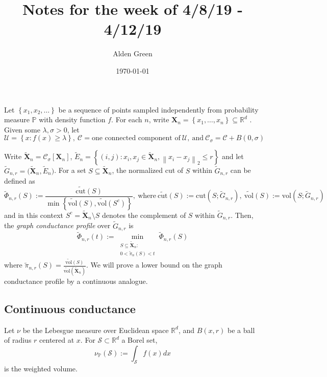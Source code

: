 \documentclass{article}
\newcommand{\Reals}{\mathbb{R}}
\newcommand{\norm}[1]{\left\lVert#1\right\rVert}
\newcommand{\set}[1]{\left\{#1\right\}}
\newcommand{\Rd}{\Reals^d}
\newcommand{\Xbf}{\mathbf{X}}
\newcommand{\Cset}{\mathcal{C}}
\newcommand{\Sset}{\mathcal{S}}
\newcommand{\Csig}{\Cset_{\sigma}}
\newcommand{\Pbb}{\mathbb{P}}
\newcommand{\1}{\mathbf{1}}
\newcommand{\cut}{\mathrm{cut}}
\newcommand{\vol}{\mathrm{vol}}
\theoremstyle{alden}
\theoremstyle{aldenthm}
\theoremstyle{remark}
\begin{document}
	
\title{Notes for the week of 4/8/19 - 4/12/19}
\author{Alden Green}
\date{\today}
\maketitle

Let $\set{x_1, x_2, \ldots}$ be a sequence of points sampled independently from probability measure $\Pbb$ with density function $f$. For each $n$, write $\Xbf_n = \set{x_1, \ldots, x_n} \subseteq \Reals^d$ . Given some $\lambda, \sigma > 0$, let
\begin{equation*}
\mathcal{U} = \set{x: f(x) \geq \lambda},~ \mathcal{C} = \textrm{one connected component of}~ \mathcal{U}, ~\textrm{and}~ \Csig = \Cset + B(0,\sigma)
\end{equation*}

Write $\widetilde{\Xbf}_n = \Csig[\Xbf_n]$, $\widetilde{E}_n = \set{(i,j): x_i, x_j \in \widetilde{\Xbf}_n, \norm{x_i - x_j}_2 \leq r}$ and let $\widetilde{G}_{n,r} = \bigl(\widetilde{\Xbf}_n, \widetilde{E}_n \bigr)$.
For a set $S \subseteq \widetilde{\Xbf}_n$, the normalized cut of $S$ within $\widetilde{G}_{n,r}$ can be defined as
\begin{equation*}
\widetilde{\Phi}_{n,r}(S) := \frac{\widetilde{\cut}(S)}{\min \set{\widetilde{\vol}(S), \widetilde{\vol}(S^c)}},~ \textrm{where}~ \widetilde{\cut}(S) := \cut(S;\widetilde{G}_{n,r}),~ \widetilde{\vol}(S) := \vol(S;\widetilde{G}_{n,r})
\end{equation*}
and in this context $S^c = \widetilde{\Xbf}_n \setminus S$ denotes the complement of $S$ within $\widetilde{G}_{n,r}$. Then, the \emph{graph conductance profile} over $\widetilde{G}_{n,r}$ is
\begin{equation*}
\widetilde{\Phi}_{n,r}(t) := \min_{\substack{S \subseteq \widetilde{\Xbf}_n: \\ 0 < \widetilde{\pi}_n(S) < t} } \widetilde{\Phi}_{n,r}(S)
\end{equation*}
where $\widetilde{\pi}_{n,r}(S) = \frac{\widetilde{\vol}(S)}{\widetilde{\vol}(\widetilde{\Xbf}_n)}$. We will prove a lower bound on the graph conductance profile by a continuous analogue. 

\subsection{Continuous conductance}

Let $\nu$ be the Lebesgue measure over Euclidean space $\Rd$, and $B(x,r)$ be a ball of radius $r$ centered at $x$. For $\Sset \subset \Rd$ a Borel set,
\begin{equation*}
\nu_{\Pbb}(\Sset) := \int_{\Sset} f(x) dx
\end{equation*}
is the weighted volume.
\end{document}

